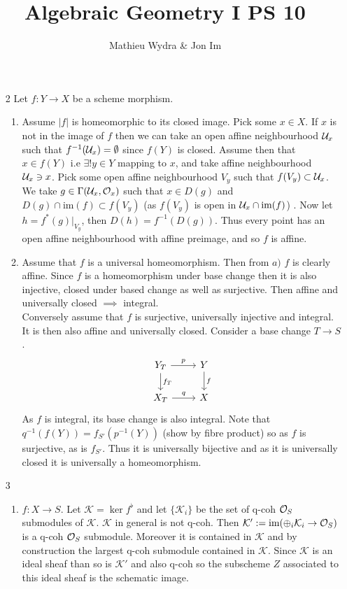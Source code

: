 \documentclass[10pt,a4paper]{article}
\title{Algebraic Geometry I PS 10}
\date{}
\author{Mathieu Wydra \& Jon Im}
\begin{document}
\maketitle
\begin{enumerate}
\item[2] Let $f:Y\to X$ be a scheme morphism. \begin{enumerate}
\item Assume $\vert f\vert$ is homeomorphic to its closed image. Pick some $x\in X$. If $x$ is not in the image of $f$ then we can take an open affine neighbourhood $\mathcal{U}_x$ such that $f^{-1}(\mathcal{U}_x) =\emptyset$ since $f(Y)$ is closed. Assume then that $x\in f(Y)$ i.e $\exists ! y\in Y$ mapping to $x$, and take affine neighbourhood $\mathcal{U}_x\ni x$. Pick some open affine neighbourhood $V_y$ such that $f(V_y)\subset \mathcal{U}_x$. We take $g\in \Gamma(\mathcal{U}_x, \mathcal{O}_x)$ such that $x\in D(g)$ and $D(g)\cap \text{im}(f)\subset f(V_y)$ (as $f(V_y)$ is open in $\mathcal{U}_x\cap \text{im}(f)$) . Now let $h = f^*(g)\vert_{V_y}$, then $D(h) = f^{-1}(D(g))$. Thus every point has an open affine neighbourhood with affine preimage, and so $f$ is affine.
\item Assume that $f$ is a universal homeomorphism. Then from $a)$ $f$ is clearly affine. Since $f$ is a homeomorphism under base change then it is also injective, closed under based change as well as surjective. Then affine and universally closed $\implies$ integral.\\
Conversely assume that $f$ is surjective, universally injective
and integral. It is then also affine and universally closed. Consider a base change $T\to S$. 
\[\begin{tikzcd}
Y_{T}\arrow[r,"p"] \arrow[d,"f_{T}"] & Y \arrow[d,"f"]\\
X_{T}\arrow[r,"q"] & X
\end{tikzcd}\]
As $f$ is integral, its base change is also integral. Note that $q^{-1}(f(Y))=f_{S'}(p^{-1}(Y))$ (show by fibre product) so as $f$ is surjective, as is $f_{S'}$. Thus it is universally bijective and as it is universally closed it is universally a homeomorphism.
\end{enumerate}
\item[3] \begin{enumerate}
\item $f:X\to S$. Let $\mathcal{K} = \ker f^\flat$ and let $\{\mathcal{K}_i\}$ be the set of q-coh $\mathcal{O}_S$ submodules of $\mathcal{K}$. $\mathcal{K}$ in general is not q-coh. Then $\mathcal{K}' := \text{im}(\oplus_i \mathcal{K}_i \to \mathcal{O}_S)$ is a q-coh $\mathcal{O}_S$ submodule. Moreover it is contained in $\mathcal{K}$ and by construction the largest q-coh submodule contained in $\mathcal{K}$. Since $\mathcal{K}$ is an ideal sheaf than so is $\mathcal{K}'$ and also q-coh so the subscheme $Z$ associated to this ideal sheaf is the schematic image.

\end{enumerate}
\end{enumerate}
\end{document}
